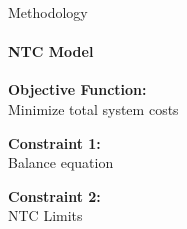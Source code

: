 \documentclass[aspectratio=169]{beamer}
\begin{document}


\begin{frame}{Methodology}
    \framesubtitle{NTC Model}

    \vspace{-0.5cm}
    \begin{minipage}[t]{0.2\textwidth}
        \begin{coloredblockdark}[blue][][][2.35cm][0ex]
                \begin{minipage}[c][2.35cm][c]{0.4\textwidth}
                    \centering
                    \Large{}
                \end{minipage}%
                \hfill
                \begin{minipage}[c][2.35cm][c]{0.55\textwidth}
                    \centering
                    \tiny\textbf{Objective Function:}\\
                    Minimize total system costs
                \end{minipage}%
                \hspace{0.05\textwidth}
        \end{coloredblockdark}

        \begin{coloredblockdark}[blue][][][2.35cm][0ex]
                \begin{minipage}[c][2.35cm][c]{0.4\textwidth}
                    \centering
                    \Large{}
                \end{minipage}%
                \hfill
                \begin{minipage}[c][2.35cm][c]{0.55\textwidth}
                    \centering
                    \tiny\textbf{Constraint 1:}\\ 
                    Balance equation
                \end{minipage}%
                \hspace{0.05\textwidth}
        \end{coloredblockdark}

        \begin{coloredblockdark}[blue][][][2.35cm][0ex]
                \begin{minipage}[c][2.35cm][c]{0.4\textwidth}
                    \centering
                    \Large{}
                \end{minipage}%
                \hfill
                \begin{minipage}[c][2.35cm][c]{0.55\textwidth}
                    \centering
                    \tiny\textbf{Constraint 2:}\\ 
                    NTC Limits
                \end{minipage}%
                \hspace{0.05\textwidth}
        \end{coloredblockdark}


\end{minipage}
\end{frame}
\end{document}
